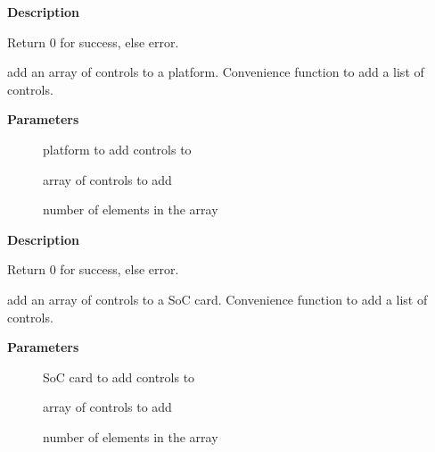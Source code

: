 \documentclass[a4paper,8pt,english]{sphinxmanual}
\begin{document}
\textbf{Description}

Return 0 for success, else error.

\begin{fulllineitems}
\label{sound/kernel-api/alsa-driver-api:c.snd_soc_add_platform_controls}
add an array of controls to a platform. Convenience function to add a list of controls.

\end{fulllineitems}


\textbf{Parameters}
\begin{description}
\item[{}] \leavevmode
platform to add controls to

\item[{}] \leavevmode
array of controls to add

\item[{}] \leavevmode
number of elements in the array

\end{description}

\textbf{Description}

Return 0 for success, else error.

\begin{fulllineitems}
\label{sound/kernel-api/alsa-driver-api:c.snd_soc_add_card_controls}
add an array of controls to a SoC card. Convenience function to add a list of controls.

\end{fulllineitems}


\textbf{Parameters}
\begin{description}
\item[{}] \leavevmode
SoC card to add controls to

\item[{}] \leavevmode
array of controls to add

\item[{}] \leavevmode
number of elements in the array

\end{description}
\end{document}
